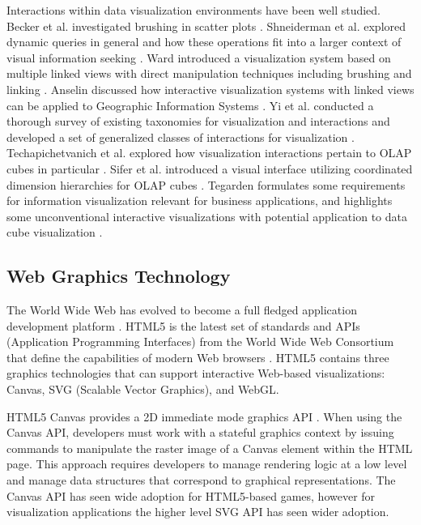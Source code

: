 Interactions within data visualization environments have been well studied. Becker et al. investigated brushing in scatter plots \cite{becker1987brushing}. Shneiderman et al. explored dynamic queries in general and how these operations fit into a larger context of visual information seeking \cite{shneiderman1994dynamic}. Ward introduced a visualization system based on multiple linked views with direct manipulation techniques including brushing and linking \cite{ward1994xmdvtool}. Anselin discussed how interactive visualization systems with linked views can be applied to Geographic Information Systems \cite{anselin1999interactive}. Yi et al. conducted a thorough survey of existing taxonomies for visualization and interactions and developed a set of generalized classes of interactions for visualization \cite{yi2007toward}. Techapichetvanich et al. explored how visualization interactions pertain to OLAP cubes in particular \cite{techapichetvanich2005interactive}. Sifer et al. introduced a visual interface utilizing coordinated dimension hierarchies for OLAP cubes \cite{sifer2003visual}. Tegarden formulates some requirements for information visualization relevant for business applications, and highlights some unconventional interactive visualizations with potential application to data cube visualization \cite{tegarden1999business}.

\subsection{Web Graphics Technology}
The World Wide Web has evolved to become a full fledged application development platform \cite{pilgrim2010html5}. HTML5 is the latest set of standards and APIs (Application Programming Interfaces) from the World Wide Web Consortium that define the capabilities of modern Web browsers \cite{html5}. HTML5 contains three graphics technologies that can support interactive Web-based visualizations: Canvas, SVG (Scalable Vector Graphics), and WebGL.

HTML5 Canvas provides a 2D immediate mode graphics API \cite{fulton2013html5}. When using the Canvas API, developers must work with a stateful graphics context by issuing commands to manipulate the raster image of a Canvas element within the HTML page. This approach requires developers to manage rendering logic at a low level and manage data structures that correspond to graphical representations. The Canvas API has seen wide adoption for HTML5-based games, however for visualization applications the higher level SVG API has seen wider adoption.

